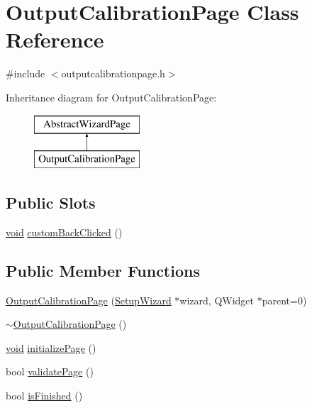 \hypertarget{class_output_calibration_page}{\section{\-Output\-Calibration\-Page \-Class \-Reference}
\label{class_output_calibration_page}
}


{\ttfamily \#include $<$outputcalibrationpage.\-h$>$}

\-Inheritance diagram for \-Output\-Calibration\-Page\-:\begin{figure}[H]
\begin{center}
\leavevmode
\includegraphics[height=2.000000cm]{class_output_calibration_page}
\end{center}
\end{figure}
\subsection*{\-Public \-Slots}
\begin{DoxyCompactItemize}
\item 
\hyperlink{group___u_a_v_objects_plugin_ga444cf2ff3f0ecbe028adce838d373f5c}{void} \hyperlink{group___output_calibration_page_ga57d81c161a6f2b1abc782e81a4707fcc}{custom\-Back\-Clicked} ()
\end{DoxyCompactItemize}
\subsection*{\-Public \-Member \-Functions}
\begin{DoxyCompactItemize}
\item 
\hyperlink{group___output_calibration_page_ga4975a50caf4226865af2d1d03e0fe82c}{\-Output\-Calibration\-Page} (\hyperlink{class_setup_wizard}{\-Setup\-Wizard} $\ast$wizard, \-Q\-Widget $\ast$parent=0)
\item 
\hyperlink{group___output_calibration_page_ga4869b75d9c4a4506853c6901d70fa8cd}{$\sim$\-Output\-Calibration\-Page} ()
\item 
\hyperlink{group___u_a_v_objects_plugin_ga444cf2ff3f0ecbe028adce838d373f5c}{void} \hyperlink{group___output_calibration_page_ga24bab144119d2bf977e40d7f33d16121}{initialize\-Page} ()
\item 
bool \hyperlink{group___output_calibration_page_ga3e208c77155e8ab46a19849174aae3b6}{validate\-Page} ()
\item 
bool \hyperlink{group___output_calibration_page_ga05fb534babe43fa9477a9d2ab14f5fbf}{is\-Finished} ()
\end{DoxyCompactItemize}
